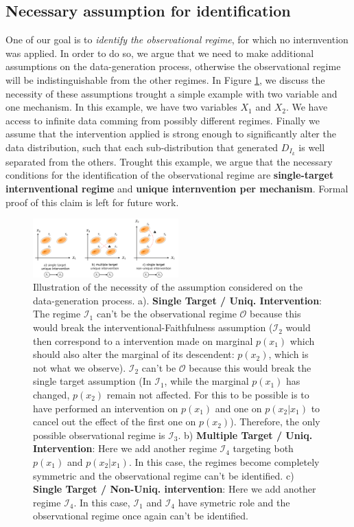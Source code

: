 \documentclass{article}
\begin{document}
\subsection{Necessary assumption for identification}\label{subsec:Relevance}

One of our goal is to \textit{identify the observational regime}, for which no
internvention was applied. In order to do so, we argue that we need to make
additional assumptions on the data-generation process, otherwise the
observational regime will be indistinguishable from the other regimes. In
Figure \ref{fig:assumption}, we discuss the necessity of these assumptions
trought a simple example with two variable and one mechanism. In this example,
we have two variables $X_1$ and $X_2$. We have access to infinite data comming
from possibly different regimes. Finally we assume that the intervention
applied is strong enough to significantly alter the data distribution, such
that each sub-distribution that generated $D_{I_k}$ is well separated from the
others. Trought this example, we argue that the necessary conditions for the
identification of the observational regime are \textbf{single-target
    internventional regime} and \textbf{unique internvention per mechanism}. Formal
proof of this claim is left for future work.

\begin{figure}
    \centering
    \includegraphics[width=0.5\textwidth]{images/assumption.pdf}
    \caption{Illustration of the necessity of the assumption considered on the data-generation process. a). \textbf{Single Target / Uniq. Intervention}: The regime $\mathcal{I}_1$ can't be the observational regime $\mathcal{O}$ because this would break the interventional-Faithfulness assumption ($\mathcal{I}_2$ would then correspond to a intervention made on marginal $p(x_1)$ which should also alter the marginal of its descendent: $p(x_2)$, which is not what we observe). $\mathcal{I}_2$ can't be $\mathcal{O}$ because this would break the single target assumption (In $\mathcal{I}_1$, while the marginal $p(x_1)$ has changed, $p(x_2)$ remain not affected. For this to be possible is to have performed an intervention on $p(x_1)$ and one on $p(x_2|x_1)$ to cancel out the effect of the first one on $p(x_2)$). Therefore, the only possible observational regime is $\mathcal{I}_3$. b) \textbf{Multiple Target / Uniq. Intervention}: Here we add another regime $\mathcal{I}_4$ targeting both $p(x_1)$ and $p(x_2|x_1)$. In this case, the regimes become completely symmetric and the observational regime can't be identified. c) \textbf{Single Target / Non-Uniq. intervention}: Here we add another regime $\mathcal{I}_4$. In this case, $\mathcal I_1$ and $\mathcal{I}_4$ have symetric role and the observational regime once again can't be identified.}
    \label{fig:assumption}
\end{figure}
\end{document}

